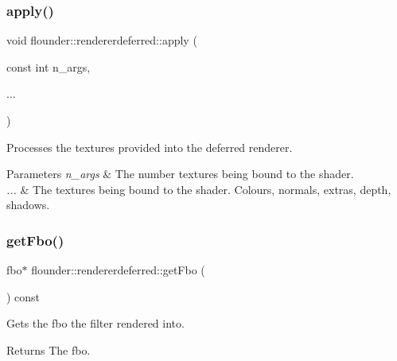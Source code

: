 \subsubsection{\texorpdfstring{apply()}{apply()}}
{\footnotesize\ttfamily void flounder\+::rendererdeferred\+::apply (\begin{DoxyParamCaption}\item[{const int}]{n\+\_\+args,  }\item[{}]{... }\end{DoxyParamCaption})}



Processes the textures provided into the deferred renderer. 


\begin{DoxyParams}{Parameters}
{\em n\+\_\+args} & The number textures being bound to the shader. \\
\hline
{\em ...} & The textures being bound to the shader. Colours, normals, extras, depth, shadows. \\
\hline
\end{DoxyParams}
\mbox{\label{classflounder_1_1rendererdeferred_a30239e1417ec3a2b0c61e4180e1b05d2}} 
\subsubsection{\texorpdfstring{get\+Fbo()}{getFbo()}}
{\footnotesize\ttfamily fbo$\ast$ flounder\+::rendererdeferred\+::get\+Fbo (\begin{DoxyParamCaption}{ }\end{DoxyParamCaption}) const\hspace{0.3cm}{\ttfamily [inline]}}



Gets the fbo the filter rendered into. 

\begin{DoxyReturn}{Returns}
The fbo. 
\end{DoxyReturn}
\mbox{\label{classflounder_1_1rendererdeferred_ac3beedaeb1e55b6bda9bde42f46184aa}} 
